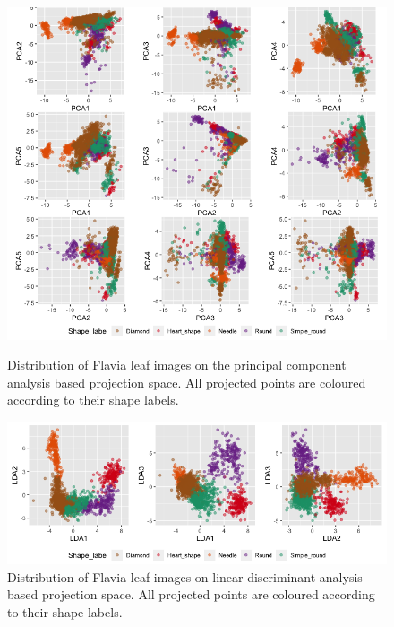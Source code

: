 \documentclass{article}
\begin{document}
\begin{figure}
\centering
\includegraphics[width=1\columnwidth]{img/flaviashapepca.png}
\caption{\label{pcaflavia}Distribution of Flavia leaf images on the
principal component analysis based projection space. All
projected points are coloured according to their shape labels.}
\includegraphics[width=1\columnwidth]{img/flavia_shape_lda.png}
\caption{\label{ldaflavia}Distribution of Flavia leaf images on linear discriminant analysis based projection space. All
projected points are coloured according to their shape labels.}
\end{figure}
\end{document}
